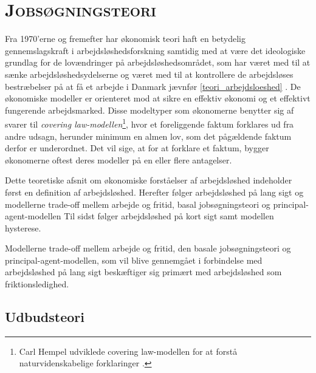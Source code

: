 

\newpage \section{\textsc{Jobsøgningsteori} \label{}}

Fra 1970'erne og fremefter har økonomisk teori haft en betydelig gennemslagskraft i arbejdsløshedsforskning samtidig med at være det ideologiske grundlag for de lovændringer på arbejdsløshedsområdet, som har været med til at sænke arbejdsløshedsydelserne og været med til at kontrollere de arbejdsløses bestræbelser på at få et arbejde i Danmark jævnfør \ref{teori_arbejdsloeshed} \parencite[19]{Andersen2003} \parencite[1679]{Atkinson1991}. De økonomiske modeller er orienteret mod at sikre en effektiv økonomi og et effektivt fungerende arbejdsmarked. Disse modeltyper som økonomerne benytter sig af svarer til \textit{covering law-modellen}\footnote{Carl Hempel udviklede covering law-modellen for at forstå naturvidenskabelige forklaringer \parencite[15]{Hedstroem2005}.}, hvor et foreliggende faktum forklares ud fra andre udsagn, herunder minimum en almen lov, som det pågældende faktum derfor er underordnet. Det vil sige, at for at forklare et faktum, bygger økonomerne oftest deres modeller på en eller flere antagelser.

Dette teoretiske afsnit om økonomiske forståelser af arbejdsløshed indeholder først en definition af arbejdsløshed. Herefter følger arbejdsløshed på lang sigt og modellerne trade-off mellem arbejde og fritid, basal jobsøgningsteori og principal-agent-modellen Til sidst følger arbejdsløshed på kort sigt samt modellen hysterese.

Modellerne trade-off mellem arbejde og fritid, den basale jobsøgningsteori og principal-agent-modellen, som vil blive gennemgået i forbindelse med arbejdsløshed på lang sigt beskæftiger sig primært med arbejdsløshed som friktionsledighed.


\subsection{Udbudsteori}

